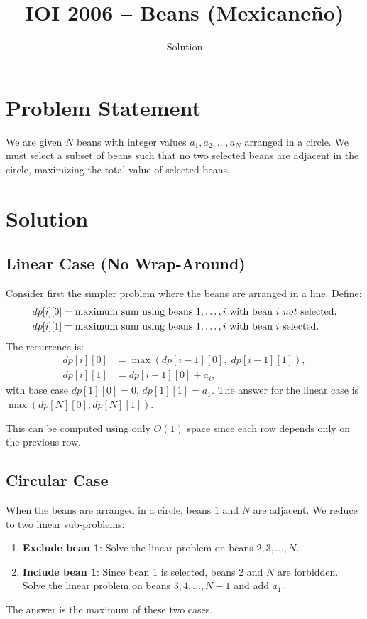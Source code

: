 \documentclass[11pt,a4paper]{article}
\title{IOI 2006 -- Beans (Mexicane\~{n}o)}
\author{Solution}
\date{}
\begin{document}
\maketitle

\section{Problem Statement}
We are given $N$ beans with integer values $a_1, a_2, \ldots, a_N$ arranged in a circle. We must select a subset of beans such that no two selected beans are adjacent in the circle, maximizing the total value of selected beans.

\section{Solution}

\subsection{Linear Case (No Wrap-Around)}
Consider first the simpler problem where the beans are arranged in a line. Define:
\begin{align*}
dp[i][0] &= \text{maximum sum using beans } 1, \ldots, i \text{ with bean } i \text{ \emph{not} selected,} \\
dp[i][1] &= \text{maximum sum using beans } 1, \ldots, i \text{ with bean } i \text{ selected.}
\end{align*}
The recurrence is:
\begin{align*}
dp[i][0] &= \max(dp[i-1][0],\; dp[i-1][1]), \\
dp[i][1] &= dp[i-1][0] + a_i,
\end{align*}
with base case $dp[1][0] = 0$, $dp[1][1] = a_1$. The answer for the linear case is $\max(dp[N][0], dp[N][1])$.

This can be computed using only $O(1)$ space since each row depends only on the previous row.

\subsection{Circular Case}
When the beans are arranged in a circle, beans $1$ and $N$ are adjacent. We reduce to two linear sub-problems:
\begin{enumerate}
    \item \textbf{Exclude bean 1}: Solve the linear problem on beans $2, 3, \ldots, N$.
    \item \textbf{Include bean 1}: Since bean 1 is selected, beans 2 and $N$ are forbidden. Solve the linear problem on beans $3, 4, \ldots, N-1$ and add $a_1$.
\end{enumerate}
The answer is the maximum of these two cases.
\end{document}
